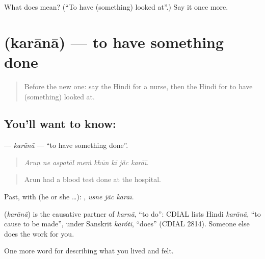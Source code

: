 \begin{tcolorbox}[breakable,colback=teal!4,colframe=teal!35!black,title={Before you move on}]
What does  mean? (\textquotedblleft{}To have (something) looked at\textquotedblright{}.) Say it once more.
\end{tcolorbox}
\section[\texorpdfstring{\hi{कराना} (karānā)}{कराना (karānā)}]{ (karānā) — to have something done}

\label{lesson:HI-C488-karana}



\begin{quote}
Before the new one: say the Hindi for a nurse, then the Hindi for to have (something) looked at.
\end{quote}

\subsection*{You'll want to know: }
\textbf{} — \emph{karānā} — \textquotedblleft{}to have something done\textquotedblright{}.

\begin{quote}
       
\end{quote}

\begin{quote}
\emph{Aruṇ ne aspatāl meṁ khūn kī jā̃c karāī.}
\end{quote}

\begin{quote}
Arun had a blood test done at the hospital.
\end{quote}

Past, with  (he or she …):   , \emph{usne jā̃c karāī}.

\begin{cousinweb}
\textbf{} (\emph{karānā}) is the causative partner of \emph{karnā}, \textquotedblleft{}to do\textquotedblright{}: CDIAL lists Hindi \emph{karānā}, \textquotedblleft{}to cause to be made\textquotedblright{}, under Sanskrit \emph{kar\'{\={o}}ti}, \textquotedblleft{}does\textquotedblright{} (CDIAL 2814). Someone else does the work for you.
\end{cousinweb}

\begin{grammarlens}[title={What you've built}]
One more word for describing what you lived and felt.
\end{grammarlens}

